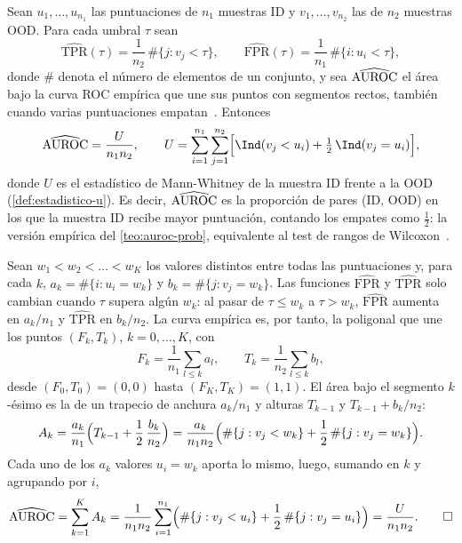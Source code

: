 \begin{corolario}\label{cor:auroc-u}
Sean $u_1, \dots, u_{n_1}$ las puntuaciones de $n_1$ muestras ID y $v_1, \dots, v_{n_2}$ las de $n_2$ muestras OOD. Para cada umbral $\tau$ sean
\[
  \widehat{\mathrm{TPR}}(\tau) = \frac{1}{n_2}\,\#\{j : v_j < \tau\}, \qquad
  \widehat{\mathrm{FPR}}(\tau) = \frac{1}{n_1}\,\#\{i : u_i < \tau\},
\]
donde $\#$ denota el número de elementos de un conjunto, y sea $\widehat{\mathrm{AUROC}}$ el área bajo la curva ROC empírica que une sus puntos con segmentos rectos, también cuando varias puntuaciones empatan~\cite[sec.~5 y alg.~2]{fawcett2006}. Entonces
\[
  \widehat{\AUROC} = \frac{U}{n_1 n_2}, \qquad
  U = \sum_{i=1}^{n_1} \sum_{j=1}^{n_2} \Bigl[\Ind(v_j < u_i) + \tfrac{1}{2}\,\Ind(v_j = u_i)\Bigr],
\]
donde $U$ es el estadístico de Mann-Whitney de la muestra ID frente a la OOD (\cref{def:estadistico-u}). Es decir, $\widehat{\mathrm{AUROC}}$ es la proporción de pares (ID, OOD) en los que la muestra ID recibe mayor puntuación, contando los empates como $\tfrac{1}{2}$: la versión empírica del \cref{teo:auroc-prob}, equivalente al test de rangos de Wilcoxon~\cite[sec.~7]{fawcett2006}.
\end{corolario}
\begin{demostracion}
Sean $w_1 < w_2 < \dots < w_K$ los valores distintos entre todas las puntuaciones y, para cada $k$, $a_k = \#\{i : u_i = w_k\}$ y $b_k = \#\{j : v_j = w_k\}$. Las funciones $\widehat{\mathrm{FPR}}$ y $\widehat{\mathrm{TPR}}$ solo cambian cuando $\tau$ supera algún $w_k$: al pasar de $\tau \le w_k$ a $\tau > w_k$, $\widehat{\mathrm{FPR}}$ aumenta en $a_k/n_1$ y $\widehat{\mathrm{TPR}}$ en $b_k/n_2$. La curva empírica es, por tanto, la poligonal que une los puntos $(F_k, T_k)$, $k = 0, \dots, K$, con
\[
  F_k = \frac{1}{n_1}\sum_{l \le k} a_l, \qquad T_k = \frac{1}{n_2}\sum_{l \le k} b_l,
\]
desde $(F_0, T_0) = (0, 0)$ hasta $(F_K, T_K) = (1, 1)$. El área bajo el segmento $k$-ésimo es la de un trapecio de anchura $a_k/n_1$ y alturas $T_{k-1}$ y $T_{k-1} + b_k/n_2$:
\[
  A_k = \frac{a_k}{n_1}\Bigl(T_{k-1} + \frac{1}{2}\,\frac{b_k}{n_2}\Bigr)
      = \frac{a_k}{n_1 n_2}\Bigl(\#\{j : v_j < w_k\} + \frac{1}{2}\,\#\{j : v_j = w_k\}\Bigr).
\]
Cada uno de los $a_k$ valores $u_i = w_k$ aporta lo mismo, luego, sumando en $k$ y agrupando por $i$,
\[
  \widehat{\mathrm{AUROC}} = \sum_{k=1}^{K} A_k
  = \frac{1}{n_1 n_2} \sum_{i=1}^{n_1} \Bigl(\#\{j : v_j < u_i\} + \frac{1}{2}\,\#\{j : v_j = u_i\}\Bigr)
  = \frac{U}{n_1 n_2}. \qedhere
\]
\end{demostracion}

